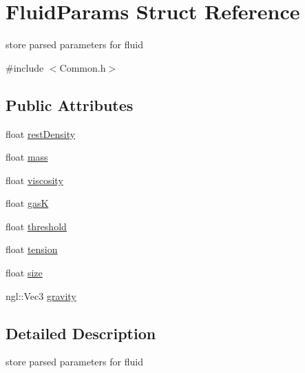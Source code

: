 \hypertarget{structFluidParams}{
\section{FluidParams Struct Reference}
\label{structFluidParams}
}


store parsed parameters for fluid  


{\ttfamily \#include $<$Common.h$>$}\subsection*{Public Attributes}
\begin{DoxyCompactItemize}
\item 
float \hyperlink{structFluidParams_a0bddcb531ccd9d80c119f847556c89c6}{restDensity}
\item 
float \hyperlink{structFluidParams_a7fab0efaff51c1fd3eb123db1cab3b16}{mass}
\item 
float \hyperlink{structFluidParams_a1bc83e65f9ffee642dd76e86ec372fbb}{viscosity}
\item 
float \hyperlink{structFluidParams_ac46f0843400e4572ee50626d35f0998b}{gasK}
\item 
float \hyperlink{structFluidParams_a3a318ea442178b0ad9982a55694168e1}{threshold}
\item 
float \hyperlink{structFluidParams_ad323627b5c0be00ef6d144f459807dbb}{tension}
\item 
float \hyperlink{structFluidParams_a4f9a314397d4ef6450744a91398c8a62}{size}
\item 
ngl::Vec3 \hyperlink{structFluidParams_afc347a2b82c0202ffabf71d7d98f37e8}{gravity}
\end{DoxyCompactItemize}


\subsection{Detailed Description}
store parsed parameters for fluid 

